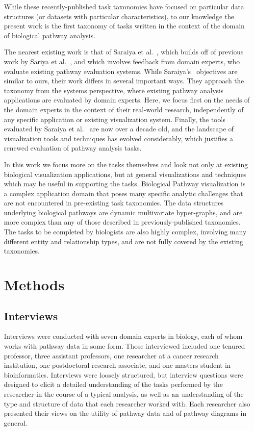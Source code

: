 \documentclass[twocolumn]{bmcart}%
\begin{document}
While these recently-published task taxonomies have focused on particular data structures (or datasets with particular characteristics), to our knowledge the present work is the first taxonomy of tasks written in the context of the domain of biological pathway analysis.

The nearest existing work is that of Saraiya et al.~\cite{saraiya2005visualizing}, which builds off of previous work by Sariya et al.~\cite{saraiya2005insight}, and which involves feedback from domain experts, who evaluate existing pathway evaluation systems.
While Saraiya's~\cite{saraiya2005visualizing} objectives are similar to ours,
their work differs in several important ways.
They approach the taxonomy from the systems perspective, where existing pathway analysis applications are evaluated by domain experts.
Here, we focus first on the needs of the domain experts in the context of their real-world research, independently of any specific application or existing visualization system.
Finally, the tools evaluated by Saraiya et al.~\cite{saraiya2005visualizing} are now over a decade old, and the landscape of visualization tools and techniques has evolved considerably, which justifies a renewed evaluation of pathway analysis tasks.


In this work we focus more on the tasks themselves and look not only at existing biological visualization applications, but at general visualizations and techniques which may be useful in supporting the tasks.
Biological Pathway visualization is a complex application domain that poses many specific analytic challenges that are not encountered in pre-existing task taxonomies.
The data structures underlying biological pathways are dynamic multivariate hyper-graphs, and are more complex than any of those described in previously-published taxonomies.
The tasks to be completed by biologists are also highly complex, involving many different entity and relationship types, and are not fully covered by the existing taxonomies.

\section*{Methods}

\subsection*{Interviews}

Interviews were conducted with seven domain experts in biology, each of whom works with pathway data in some form.
Those interviewed included one tenured professor, three assistant professors, one researcher at a cancer research institution, one postdoctoral research associate, and one masters student in bioinformatics.
Interviews were loosely structured, but interview questions were designed to elicit a detailed understanding of the tasks performed by the researcher in the course of a typical analysis, as well as an understanding of the type and structure of data that each researcher worked with.
Each researcher also presented their views on the utility of pathway data and of pathway diagrams in general.
\end{document}
